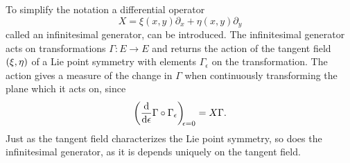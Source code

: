 To simplify the notation a differential operator
\begin{equation}
  X = \xi(x,y) \partial_x + \eta(x,y) \partial_y
\end{equation}
called an infinitesimal generator, can be introduced.
The infinitesimal generator acts on transformations \(\Gamma: E \to E\) and returns the action of the tangent field \(\qty(\xi, \eta)\) of a Lie point symmetry with elements \(\Gamma_\epsilon\) on the transformation.
The action gives a measure of the change in \(\Gamma\) when continuously transforming the plane which it acts on, since
\begin{equation}
  \diff*{\Gamma \circ \Gamma_\epsilon}{\epsilon}[\epsilon = 0] = X \Gamma.
\end{equation}
Just as the tangent field characterizes the Lie point symmetry, so does the infinitesimal generator, as it is depends uniquely on the tangent field.


